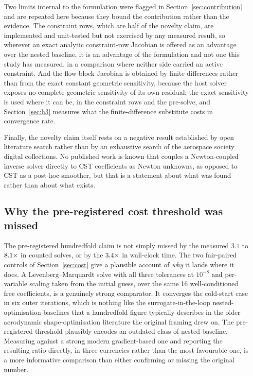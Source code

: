 Two limits internal to the formulation were flagged in
Section~\ref{sec:contribution} and are repeated here because they bound the
contribution rather than the evidence. The constraint rows, which are half of
the novelty claim, are implemented and unit-tested but not exercised by any
measured result, so wherever an exact analytic constraint-row Jacobian is
offered as an advantage over the nested baseline, it is an advantage of the
formulation and not one this study has measured, in a comparison where neither
side carried an active constraint. And the flow-block Jacobian is obtained by
finite differences rather than from the exact constant geometric sensitivity,
because the host solver exposes no complete geometric sensitivity of its own
residual; the exact sensitivity is used where it can be, in the constraint
rows and the pre-solve, and Section~\ref{sec:h3} measures what the
finite-difference substitute costs in convergence rate.

Finally, the novelty claim itself rests on a negative result established by
open literature search rather than by an exhaustive search of the aerospace
society digital collections. No published work is known that couples a
Newton-coupled inverse solver directly to CST coefficients as Newton unknowns,
as opposed to CST as a post-hoc smoother, but that is a statement about what
was found rather than about what exists.

\subsection{Why the pre-registered cost threshold was missed}
\label{sec:outdated-baseline}

The pre-registered hundredfold claim is not simply missed by the measured
$3.1$ to $8.1\times$ in counted solves, or by the $3.4\times$ in wall-clock time. The
two fair-paired controls of Section~\ref{sec:cost} give a plausible account of
\emph{why} it lands where it does. A Levenberg--Marquardt solve with all three
tolerances at $10^{-8}$ and per-variable scaling taken from the initial guess,
over the same 16 well-conditioned free coefficients, is a genuinely strong
comparator. It converges the cold-start case in six outer iterations, which is
nothing like the surrogate-in-the-loop nested-optimisation baselines that a
hundredfold figure typically describes in the older aerodynamic
shape-optimisation literature the original framing drew on. The pre-registered
threshold plausibly encodes an outdated class of nested baseline. Measuring
against a strong modern gradient-based one and reporting the resulting ratio
directly, in three currencies rather than the most favourable one, is a more
informative comparison than either confirming or missing the original number.
